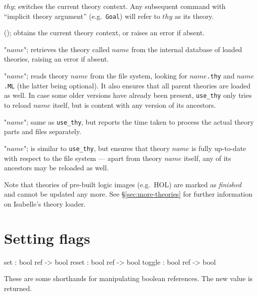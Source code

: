 \begin{ttdescription}
  
\item[\ttindexbold{context} $thy$;] switches the current theory context.  Any
  subsequent command with ``implicit theory argument'' (e.g.\ \texttt{Goal})
  will refer to $thy$ as its theory.
  
\item[\ttindexbold{the_context}();] obtains the current theory context, or
  raises an error if absent.
  
\item[\ttindexbold{theory} "$name$";] retrieves the theory called $name$ from
  the internal data\-base of loaded theories, raising an error if absent.
  
\item[\ttindexbold{use_thy} "$name$";] reads theory $name$ from the file
  system, looking for $name$\texttt{.thy} and $name$\texttt{.ML} (the latter
  being optional).  It also ensures that all parent theories are loaded as
  well.  In case some older versions have already been present,
  \texttt{use_thy} only tries to reload $name$ itself, but is content with any
  version of its ancestors.
  
\item[\ttindexbold{time_use_thy} "$name$";] same as \texttt{use_thy}, but
  reports the time taken to process the actual theory parts and {\ML} files
  separately.
  
\item[\ttindexbold{update_thy} "$name$";] is similar to \texttt{use_thy}, but
  ensures that theory $name$ is fully up-to-date with respect to the file
  system --- apart from theory $name$ itself, any of its ancestors may be
  reloaded as well.
  
\end{ttdescription}

Note that theories of pre-built logic images (e.g.\ HOL) are marked as
\emph{finished} and cannot be updated any more.  See \S\ref{sec:more-theories}
for further information on Isabelle's theory loader.


\section{Setting flags}
\begin{ttbox}
set     : bool ref -> bool
reset   : bool ref -> bool
toggle  : bool ref -> bool
\end{ttbox}
These are some shorthands for manipulating boolean references.  The new
value is returned.


